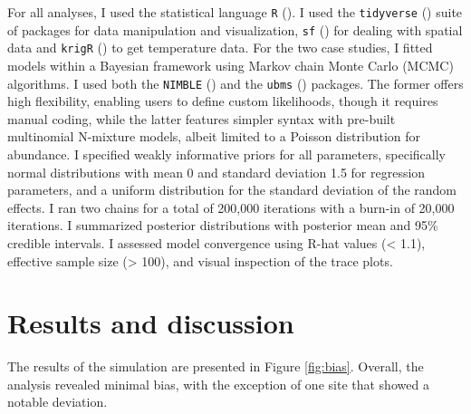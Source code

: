\documentclass[
  11pt,
  a4paper,
]{article}
\begin{document}
For all analyses, I used the statistical language \texttt{R} (). I used the \texttt{tidyverse} () suite of packages for data manipulation and visualization, \texttt{sf} () for dealing with spatial data and \texttt{krigR} () to get temperature data. For the two case studies, I fitted models within a Bayesian framework using Markov chain Monte Carlo (MCMC) algorithms. I used both the \texttt{NIMBLE} () and the \texttt{ubms} () packages. The former offers high flexibility, enabling users to define custom likelihoods, though it requires manual coding, while the latter features simpler syntax with pre-built multinomial N-mixture models, albeit limited to a Poisson distribution for abundance. I specified weakly informative priors for all parameters, specifically normal distributions with mean 0 and standard deviation 1.5 for regression parameters, and a uniform distribution for the standard deviation of the random effects. I ran two chains for a total of 200,000 iterations with a burn-in of 20,000 iterations. I summarized posterior distributions with posterior mean and 95\% credible intervals. I assessed model convergence using R-hat values (\textless{} 1.1), effective sample size (\textgreater{} 100), and visual inspection of the trace plots.

\section{Results and discussion}\label{results-and-discussion}

The results of the simulation are presented in Figure \ref{fig:bias}. Overall, the analysis revealed minimal bias, with the exception of one site that showed a notable deviation.
\end{document}
